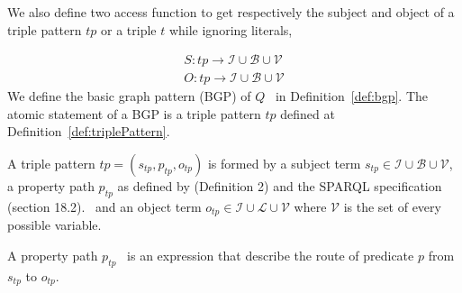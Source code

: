 We also define two access function to get respectively the subject and object of a triple pattern $tp$ or a triple $t$ while ignoring literals,

\begin{equation}
    \begin{aligned}
        S: tp \rightarrow \mathcal{I} \cup \mathcal{B} \cup \mathcal{V} \\
        O: tp \rightarrow \mathcal{I} \cup \mathcal{B} \cup \mathcal{V}
    \end{aligned}
 \end{equation}
\iffalse
We define the basic graph pattern (BGP) of $Q$~ in Definition~\ref{def:bgp}.
The atomic statement of a BGP is a triple pattern $tp$ defined at Definition~\ref{def:triplePattern}.

\begin{definition}\label{def:triplePattern}
    A triple pattern $tp = (s_{tp},p_{tp},o_{tp})$ is formed by a subject term $s_{tp} \in \mathcal{I} \cup \mathcal{B} \cup \mathcal{V}$, 
    a property path  $p_{tp}$ as defined by  \citeauthor{Kostylev2015} (Definition 2) and the SPARQL specification (section 18.2).~ 
    and an object term  $o_{tp} \in \mathcal{I} \cup \mathcal{L} \cup \mathcal{V}$ 
    where $\mathcal{V}$ is the set of every possible variable. 
\end{definition}

\begin{definition}\label{def:propertyPath}
   A property path $p_{tp}$~\cite{Kostylev2015} is an expression that describe the route of predicate $p$ from $s_{tp}$ to $o_{tp}$.
   \iffalse
   A property path in $tp$ is defined as follow:
   \begin{equation}
    p_{tp} ::= p \in \mathcal{I} | (p_{tpi}/p_{tpj}) | (p_{tpi}|p_{tpj}) | p_{tpi}* | p_{tpi}+ | p_{tpi}? | !p_{tpi}| p_{tpi}^{-}
   \end{equation}.
   The "$/$" operator chain two property path, the alternative operator "$|$" define a possibility between $p_{tpi}$ and $p_{tpj}$.
   The "$^-$" operator inverse the path from $s_{tp}$ to $o_{tp}$.
   The "$!$" represent the negation of a path $p_{tpi}$ such as $p_{tpi} = \mathcal{I} \setminus p_{tpi}$.
   The "$*$", "$+$" and "$?$", refered to in this paper as \emph{cardinality property paths}, are respectively; the repetition of 0 and more of $p_{tpi}$, 
   the repetition of 1 and more of $p_{tpi}$ and the presence or absence of $p_{tpi}$.
   \fi
\end{definition}

